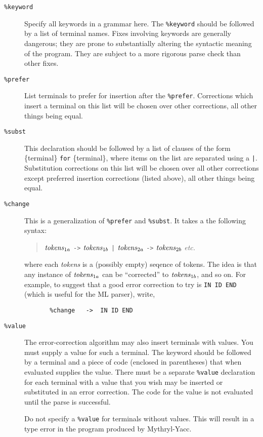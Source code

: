 \begin{description}
\item[{\tt \%keyword}]
    Specify all keywords in a grammar here.  The {\tt \%keyword}
    should be followed by a list
    of terminal names.   Fixes involving keywords are generally dangerous;
    they are prone to substantially altering the syntactic meaning
    of the program.  They are subject to a more rigorous parse check than
    other fixes.

\item[{\tt \%prefer}]
     List terminals to prefer for insertion after the {\tt \%prefer}.
Corrections which insert a terminal on this list will be chosen over
other corrections, all other things being equal.
\item[{\tt \%subst}]
        This declaration should be followed by a list of clauses of the
     form \{terminal\} {\tt for} \{terminal\}, where items on the list are
     separated using a {\tt |}.  Substitution corrections on this list
will be chosen over all other corrections except preferred insertion
corrections (listed above), all other things being equal.
\item[{\tt \%change}]
    This is a generalization of {\tt \%prefer}  and {\tt \%subst}.
It takes a the following syntax:
\begin{quote}
${\it tokens}_{1a}$ \verb|->| ${\it tokens}_{1b}$ \verb+|+ ${\it tokens}_{2a}$ \verb|->| ${\it tokens}_{2b}$ {\it etc.}
\end{quote}
where each {\it tokens} is a (possibly empty) seqence of tokens.  The
idea is that any instance of ${\it tokens}_{1a}$ can be ``corrected'' to
${\it tokens}_{1b}$, and so on.  For example, to suggest that a good
error correction to try is \verb|IN ID END| (which is useful for the
ML parser), write,
\begin{verbatim}
       %change   ->  IN ID END
\end{verbatim}
\item[{\tt \%value}]
        The error-correction algorithm may also insert terminals with values.
     You must supply a value for such a terminal. The keyword
     should be followed by a terminal and a piece of
     code (enclosed in parentheses) that when evaluated supplies the value. 
     There must be a separate {\tt \%value} declaration for each terminal with
     a value that you wish may be inserted or substituted in an error correction.
     The code for the value is not evaluated until the parse is
     successful.

         Do not specify a {\tt \%value} for terminals without
     values. This will result in a type error in the program produced by
     Mythryl-Yacc.
\end{description}


